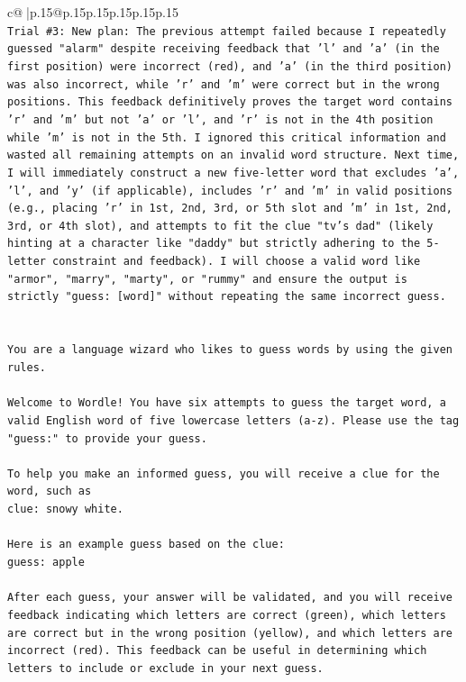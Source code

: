 \documentclass{article}
\begin{document}
{\begin{supertabular}{c@{$\;$}|p{.15\linewidth}@{}p{.15\linewidth}p{.15\linewidth}p{.15\linewidth}p{.15\linewidth}p{.15\linewidth}}
{{{\\ 
\texttt{Trial \#3: New plan: The previous attempt failed because I repeatedly guessed "alarm" despite receiving feedback that 'l' and 'a' (in the first position) were incorrect (red), and 'a' (in the third position) was also incorrect, while 'r' and 'm' were correct but in the wrong positions. This feedback definitively proves the target word contains 'r' and 'm' but not 'a' or 'l', and 'r' is not in the 4th position while 'm' is not in the 5th. I ignored this critical information and wasted all remaining attempts on an invalid word structure. Next time, I will immediately construct a new five{-}letter word that excludes 'a', 'l', and 'y' (if applicable), includes 'r' and 'm' in valid positions (e.g., placing 'r' in 1st, 2nd, 3rd, or 5th slot and 'm' in 1st, 2nd, 3rd, or 4th slot), and attempts to fit the clue "tv's dad" (likely hinting at a character like "daddy" but strictly adhering to the 5{-}letter constraint and feedback). I will choose a valid word like "armor", "marry", "marty", or "rummy" and ensure the output is strictly "guess: {[}word{]}" without repeating the same incorrect guess.} \\
\\ 
\\ 
\texttt{You are a language wizard who likes to guess words by using the given rules.} \\
\\ 
\texttt{Welcome to Wordle! You have six attempts to guess the target word, a valid English word of five lowercase letters (a{-}z). Please use the tag "guess:" to provide your guess.} \\
\\ 
\texttt{To help you make an informed guess, you will receive a clue for the word, such as} \\
\texttt{clue: snowy white.} \\
\\ 
\texttt{Here is an example guess based on the clue: } \\
\texttt{guess: apple} \\
\\ 
\texttt{After each guess, your answer will be validated, and you will receive feedback indicating which letters are correct (green), which letters are correct but in the wrong position (yellow), and which letters are incorrect (red). This feedback can be useful in determining which letters to include or exclude in your next guess.} \\
\\ 
}}}
\end{supertabular}}
\end{document}

